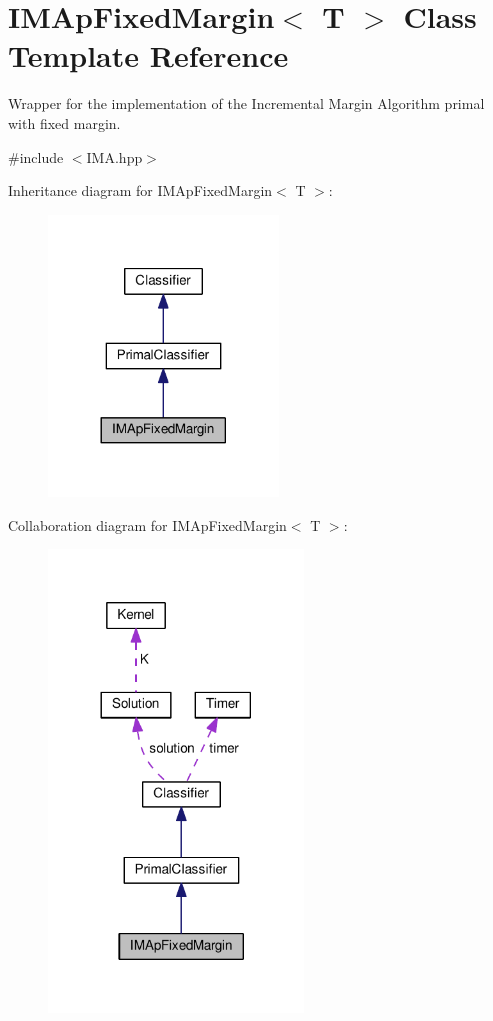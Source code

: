 \hypertarget{class_i_m_ap_fixed_margin}{}\section{I\+M\+Ap\+Fixed\+Margin$<$ T $>$ Class Template Reference}
\label{class_i_m_ap_fixed_margin}


Wrapper for the implementation of the Incremental Margin Algorithm primal with fixed margin.  




{\ttfamily \#include $<$I\+M\+A.\+hpp$>$}



Inheritance diagram for I\+M\+Ap\+Fixed\+Margin$<$ T $>$\+:\nopagebreak
\begin{figure}[H]
\begin{center}
\leavevmode
\includegraphics[width=173pt]{class_i_m_ap_fixed_margin__inherit__graph}
\end{center}
\end{figure}


Collaboration diagram for I\+M\+Ap\+Fixed\+Margin$<$ T $>$\+:\nopagebreak
\begin{figure}[H]
\begin{center}
\leavevmode
\includegraphics[width=192pt]{class_i_m_ap_fixed_margin__coll__graph}
\end{center}
\end{figure}
